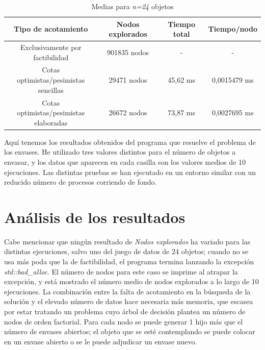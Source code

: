 \documentclass[12pt , a4paper]{article}
\begin{document}
\begin{table}[h!]
	\centering
	\begin{tabular}{||c || c c c||} 
		\hline
		Tipo de acotamiento 									& Nodos explorados		& Tiempo total 		& Tiempo/nodo 	\\ [0.5ex] 
		\hline\hline
		Exclusivamente por factibilidad 						& 901835 nodos			& - 				& -
		\\ \hline
		\makecell{Cotas optimistas/pesimistas \\ sencillas}		& 29471 nodos			& 45,62 ms 			& 0,0015479 ms
		\\ 	\hline
		\makecell{Cotas optimistas/pesimistas \\ elaboradas} 	& 26672 nodos			& 73,87 ms			& 0,0027695 ms 	
		\\ 	\hline
	\end{tabular}
	\caption{Medias para \textit{n=24} objetos}
	\label{table:1}
\end{table}
	
Aquí tenemos los resultados obtenidos del programa que resuelve el problema de los envases. He utilizado tres valores distintos para el número de objetos a envasar, y los datos que aparecen en cada casilla son los valores medios de 10 ejecuciones. Las distintas pruebas se han ejecutado en un entorno similar con un reducido número de procesos corriendo de fondo.

\newpage
\section{Análisis de los resultados}
Cabe mencionar que ningún resultado de \textit{Nodos explorados} ha variado para las distintas ejecuciones, salvo uno del juego de datos de 24 objetos; cuando no se usa más poda que la de factibilidad, el programa termina lanzando la excepción \textit{std::bad\_alloc}. El número de nodos para este caso se imprime al atrapar la excepción, y está mostrado el número medio de nodos explorados a lo largo de 10 ejecuciones. La combinación entre la falta de acotamiento en la búsqueda de la solución y el elevado número de datos hace necesaria más memoria, que escasea por estar tratando un problema cuyo árbol de decisión plantea un número de nodos de orden factorial. Para cada nodo se puede generar 1 hijo más que el número de envases abiertos; el objeto que se esté contemplando se puede colocar en un envase abierto o se le puede adjudicar un envase nuevo.
\\
\end{document}
